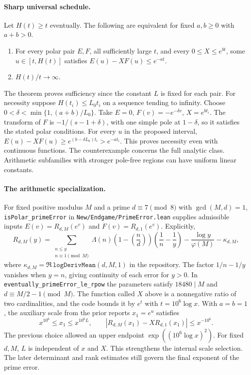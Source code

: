 \paragraph{Sharp universal schedule.}
Let $H(t)\ge t$ eventually. The following are equivalent for fixed $a,b\ge0$ with $a+b>0$.
\begin{enumerate}
\item For every polar pair $E,F$, all sufficiently large $t$, and every $0\le X\le e^{bt}$, some $u\in[t,H(t)]$ satisfies $E(u)-XF(u)\le e^{-at}$.
\item $H(t)/t\to\infty$.
\end{enumerate}
The theorem proves sufficiency since the constant $L$ is fixed for each pair. For necessity suppose $H(t_i)\le L_0t_i$ on a sequence tending to infinity. Choose $0<\delta<\min\{1,(a+b)/L_0\}$. Take $E=0$, $F(v)=-e^{-\delta v}$, $X=e^{bt_i}$. The transform of $F$ is $-1/(s-1+\delta)$, with one simple pole at $1-\delta$, so it satisfies the stated polar conditions. For every $u$ in the proposed interval, $E(u)-XF(u)\ge e^{(b-\delta L_0)t_i}> e^{-at_i}$. This proves necessity even with continuous functions. The counterexample concerns the full analytic class. Arithmetic subfamilies with stronger pole-free regions can have uniform linear constants.

\paragraph{The arithmetic specialization.}
For fixed positive modulus $M$ and a prime $d\equiv7\pmod 8$ with $\gcd(M,d)=1$, \texttt{isPolar\_primeError} in \texttt{New/Endgame/PrimeError.lean} supplies admissible inputs $E(v)=R_{d,M}(e^v)$ and $F(v)=R_{d,1}(e^v)$. Explicitly,
\[
 R_{d,M}(y)=
 \sum_{\substack{n\le y\\n\equiv1\pmod M}}\!
 \Lambda(n)\left(1-\left(\frac nd\right)\right)
 \left(\frac1n-\frac1y\right)-\frac{\log y}{\varphi(M)}-\kappa_{d,M},
\]
where $\kappa_{d,M}=\Re\,\texttt{logDerivMean}(d,M,1)$ in the repository.
The factor $1/n-1/y$ vanishes when $y=n$, giving continuity of each error for $y>0$. In \texttt{eventually\_primeError\_le\_rpow} the parameters satisfy $18480\mid M$ and $d\equiv M/2-1\pmod M$. The function called $X$ above is a nonnegative ratio of two cardinalities, and the code bounds it by $e^t$ with $t=10^6\log x$. With $a=b=1$, the auxiliary scale from the prior reports $x_1=e^u$ satisfies
\[
  x^{10^6}\le x_1\le x^{10^6 L},
  \qquad |R_{d,M}(x_1)-X R_{d,1}(x_1)|\le x^{-10^6}.
\]
The previous choice allowed an upper endpoint $\exp((10^6\log x)^2)$. For fixed $d,M$, $L$ is independent of $x$ and $X$. This strengthens the internal scale selection. The later determinant and rank estimates still govern the final exponent of the prime error.
